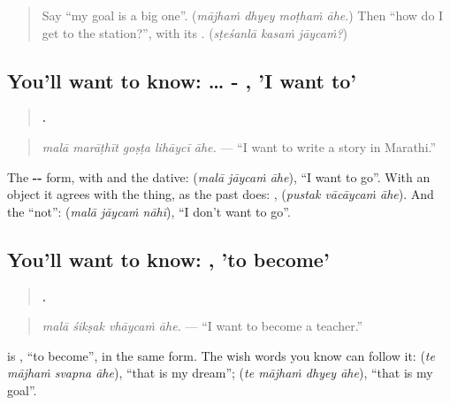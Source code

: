 \begin{quote}
Say \textquotedblleft{}my goal is a big one\textquotedblright{}. (\emph{mājhaṁ dhyey moṭhaṁ āhe}.) Then \textquotedblleft{}how do I get to the station?\textquotedblright{}, with its \textbf{}. (\emph{sṭeśanlā kasaṁ jāycaṁ?})
\end{quote}

\subsection*{You'll want to know:  … - , 'I want to'}
\begin{quote}
\textbf{    .}
\end{quote}

\begin{quote}
\emph{malā marāṭhīt goṣṭa lihāycī āhe.} — \textquotedblleft{}I want to write a story in Marathi.\textquotedblright{}
\end{quote}

The \textbf{--} form, with \textbf{} and the dative: \textbf{  } (\emph{malā jāycaṁ āhe}), \textquotedblleft{}I want to go\textquotedblright{}. With an object it agrees with the thing, as the past does: \textbf{  }, \textbf{  } (\emph{pustak vācāycaṁ āhe}). And the \textquotedblleft{}not\textquotedblright{}: \textbf{  } (\emph{malā jāycaṁ nāhī}), \textquotedblleft{}I don't want to go\textquotedblright{}.

\subsection*{You'll want to know: , 'to become'}
\begin{quote}
\textbf{   .}
\end{quote}

\begin{quote}
\emph{malā śikṣak vhāycaṁ āhe.} — \textquotedblleft{}I want to become a teacher.\textquotedblright{}
\end{quote}

\textbf{} is \textbf{}, \textquotedblleft{}to become\textquotedblright{}, in the same form. The wish words you know can follow it: \textbf{   } (\emph{te mājhaṁ svapna āhe}), \textquotedblleft{}that is my dream\textquotedblright{}; \textbf{   } (\emph{te mājhaṁ dhyey āhe}), \textquotedblleft{}that is my goal\textquotedblright{}.

